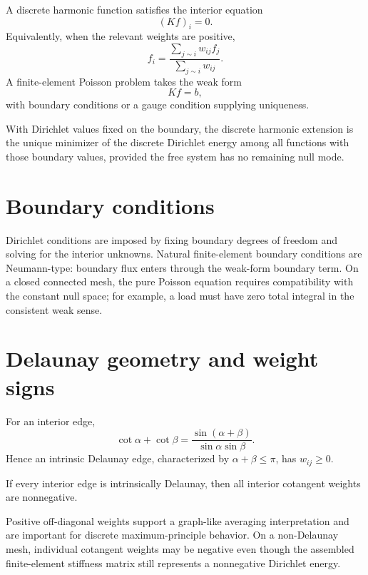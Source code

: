 A discrete harmonic function satisfies the interior equation
\[
(Kf)_i=0.
\]
Equivalently, when the relevant weights are positive,
\[
f_i=
\frac{\sum_{j\sim i}w_{ij}f_j}{\sum_{j\sim i}w_{ij}}.
\]
A finite-element Poisson problem takes the weak form
\[
Kf=b,
\]
with boundary conditions or a gauge condition supplying uniqueness.

\begin{proposition}\label{prop:vii41-variational}
With Dirichlet values fixed on the boundary, the discrete harmonic extension is
the unique minimizer of the discrete Dirichlet energy among all functions with
those boundary values, provided the free system has no remaining null mode.
\end{proposition}

\section{Boundary conditions}

Dirichlet conditions are imposed by fixing boundary degrees of freedom and
solving for the interior unknowns.  Natural finite-element boundary conditions
are Neumann-type: boundary flux enters through the weak-form boundary term.
On a closed connected mesh, the pure Poisson equation requires compatibility
with the constant null space; for example, a load must have zero total integral
in the consistent weak sense.

\section{Delaunay geometry and weight signs}

For an interior edge,
\[
\cot\alpha+\cot\beta
=
\frac{\sin(\alpha+\beta)}{\sin\alpha\sin\beta}.
\]
Hence an intrinsic Delaunay edge, characterized by
\(\alpha+\beta\le\pi\), has \(w_{ij}\ge0\).

\begin{theorem}\label{thm:vii41-delaunay}
If every interior edge is intrinsically Delaunay, then all interior cotangent
weights are nonnegative.
\end{theorem}

Positive off-diagonal weights support a graph-like averaging interpretation and
are important for discrete maximum-principle behavior.  On a non-Delaunay mesh,
individual cotangent weights may be negative even though the assembled
finite-element stiffness matrix still represents a nonnegative Dirichlet energy.

